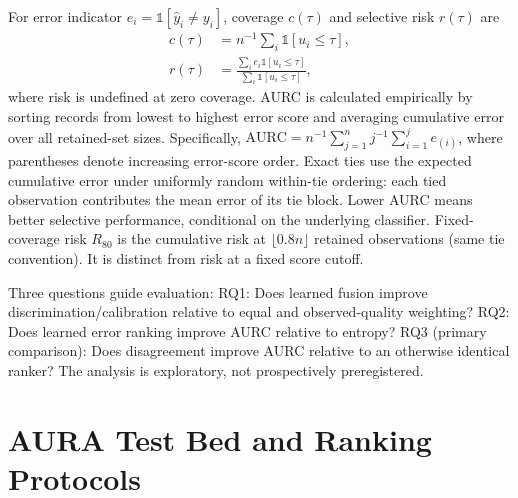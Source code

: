 \documentclass[conference]{IEEEtran}
\begin{document}
For error indicator $e_i=\mathbb{1}[\hat y_i\neq y_i]$, coverage $c(\tau)$ and selective risk $r(\tau)$ are
\begin{align}
c(\tau)&=n^{-1}\sum_i\mathbb{1}[u_i\leq\tau],\\
r(\tau)&=\frac{\sum_i e_i\mathbb{1}[u_i\leq\tau]}{\sum_i\mathbb{1}[u_i\leq\tau]},
\end{align}
where risk is undefined at zero coverage. AURC is calculated empirically by sorting records from lowest to highest error score and averaging cumulative error over all retained-set sizes. Specifically, $\mathrm{AURC}=n^{-1}\sum_{j=1}^{n}j^{-1}\sum_{i=1}^{j}e_{(i)}$, where parentheses denote increasing error-score order. Exact ties use the expected cumulative error under uniformly random within-tie ordering: each tied observation contributes the mean error of its tie block. Lower AURC means better selective performance, conditional on the underlying classifier. Fixed-coverage risk $R_{80}$ is the cumulative risk at $\lfloor0.8n\rfloor$ retained observations (same tie convention). It is distinct from risk at a fixed score cutoff.

Three questions guide evaluation: RQ1: Does learned fusion improve discrimination/calibration relative to equal and observed-quality weighting? RQ2: Does learned error ranking improve AURC relative to entropy? RQ3 (primary comparison): Does disagreement improve AURC relative to an otherwise identical ranker? The analysis is exploratory, not prospectively preregistered.
\section{AURA Test Bed and Ranking Protocols}
\end{document}
